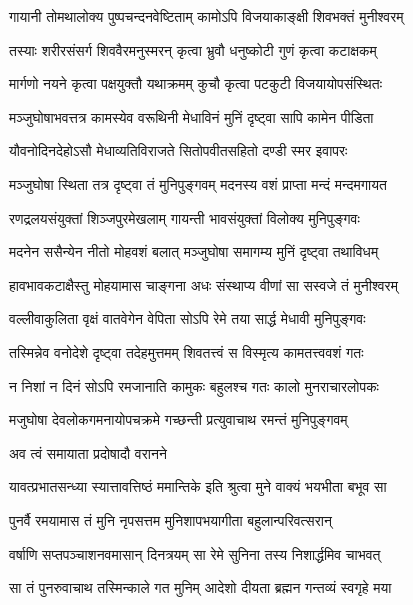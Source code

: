 \twolineshloka
{गायानी तोमथालोक्य पुष्पचन्दनवेष्टिताम्}
{कामोऽपि विजयाकाङ्क्षी शिवभक्तं मुनीश्वरम्} %

\twolineshloka
{तस्याः शरीरसंसर्ग शिववैरमनुस्मरन्}
{कृत्वा भ्रुवौ धनुष्कोटी गुणं कृत्वा कटाक्षकम्} %

\twolineshloka
{मार्गणो नयने कृत्वा पक्षयुक्तौ यथाक्रमम्}
{कुचौ कृत्वा पटकुटी विजयायोपसंस्थितः} %

\twolineshloka
{मञ्जुघोषाभवत्तत्र कामस्येव वरूथिनी}
{मेधाविनं मुनिं दृष्ट्वा सापि कामेन पीडिता} %

\twolineshloka
{यौवनोदिनदेहोऽसौ मेधाव्यतिविराजते}
{सितोपवीतसहितो दण्डी स्मर इवापरः} %

\twolineshloka
{मञ्जुघोषा स्थिता तत्र दृष्ट्वा तं मुनिपुङ्गवम्}
{मदनस्य वशं प्राप्ता मन्दं मन्दमगायत} %

\twolineshloka
{रणद्रलयसंयुक्तां शिञ्जपुरमेखलाम्}
{गायन्ती भावसंयुक्तां विलोक्य मुनिपुङ्गवः} %

\twolineshloka
{मदनेन ससैन्येन नीतो मोहवशं बलात्}
{मञ्जुघोषा समागम्य मुनिं दृष्ट्वा तथाविधम्} %

\twolineshloka
{हावभावकटाक्षैस्तु मोहयामास चाङ्गना}
{अधः संस्थाप्य वीणां सा सस्वजे तं मुनीश्वरम्} %

\twolineshloka
{वल्लीवाकुलिता वृक्षं वातवेगेन वेपिता}
{सोऽपि रेमे तया सार्द्ध मेधावी मुनिपुङ्गवः} %

\twolineshloka
{तस्मिन्नेव वनोदेशे दृष्ट्वा तदेहमुत्तमम्}
{शिवतत्त्वं स विस्मृत्य कामतत्त्ववशं गतः} %

\twolineshloka
{न निशां न दिनं सोऽपि रमजानाति कामुकः}
{बहुलश्च गतः कालो मुनराचारलोपकः} %

\twolineshloka
{मजुघोषा देवलोकगमनायोपचक्रमे}
{गच्छन्ती प्रत्युवाचाथ रमन्तं मुनिपुङ्गवम्} %



\onelineshloka
{अव त्वं समायाता प्रदोषादौ वरानने} %

\twolineshloka
{यावत्प्रभातसन्ध्या स्यात्तावत्तिष्ठं ममान्तिके}
{इति श्रुत्वा मुने वाक्यं भयभीता बभूव सा} %

\twolineshloka
{पुनर्वै रमयामास तं मुनि नृपसत्तम}
{मुनिशापभयागीता बहुलान्परिवत्सरान्} %

\twolineshloka
{वर्षाणि सप्तपञ्चाशनवमासान् दिनत्रयम्}
{सा रेमे सुनिना तस्य निशार्द्धमिव चाभवत्} %

\twolineshloka
{सा तं पुनरुवाचाथ तस्मिन्काले गत मुनिम्}
{आदेशो दीयता ब्रह्मन गन्तव्यं स्वगृहे मया} %

